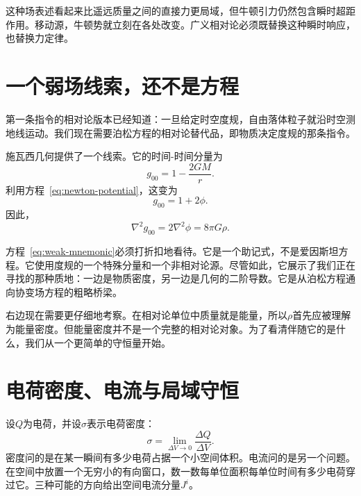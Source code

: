 \begin{classroomqa}
\end{classroomqa}

这种场表述看起来比遥远质量之间的直接力更局域，但牛顿引力仍然包含瞬时超距作用。移动源，牛顿势就立刻在各处改变。广义相对论必须既替换这种瞬时响应，也替换力定律。

\section{一个弱场线索，还不是方程}

第一条指令的相对论版本已经知道：一旦给定时空度规，自由落体粒子就沿时空测地线运动。我们现在需要泊松方程的相对论替代品，即物质决定度规的那条指令。

施瓦西几何提供了一个线索。它的时间-时间分量为
\begin{equation}
 g_{00}=1-\frac{2GM}{r}.
\end{equation}
利用方程~\eqref{eq:newton-potential}，这变为
\begin{equation}
 g_{00}=1+2\phi.
\end{equation}
因此，
\begin{equation}
 \nabla^2g_{00}=2\nabla^2\phi=8\pi G\rho.
 \label{eq:weak-mnemonic}
\end{equation}

方程~\eqref{eq:weak-mnemonic}必须打折扣地看待。它是一个助记式，不是爱因斯坦方程。它使用度规的一个特殊分量和一个非相对论源。尽管如此，它展示了我们正在寻找的那种质地：一边是物质密度，另一边是几何的二阶导数。它是从泊松方程通向协变场方程的粗略桥梁。

右边现在需要更仔细地考察。在相对论单位中质量就是能量，所以\(\rho\)首先应被理解为能量密度。但能量密度并不是一个完整的相对论对象。为了看清伴随它的是什么，我们从一个更简单的守恒量开始。

\section{电荷密度、电流与局域守恒}

设\(Q\)为电荷，并设\(\sigma\)表示电荷密度：
\begin{equation}
 \sigma=\lim_{\Delta V\to0}\frac{\Delta Q}{\Delta V}.
\end{equation}
密度问的是在某一瞬间有多少电荷占据一个小空间体积。电流问的是另一个问题。在空间中放置一个无穷小的有向窗口，数一数每单位面积每单位时间有多少电荷穿过它。三种可能的方向给出空间电流分量\(J^i\)。

